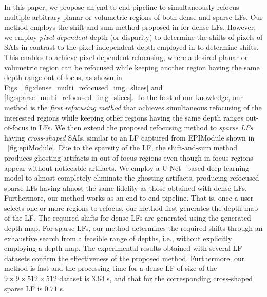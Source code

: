 In this paper, we propose an end-to-end pipeline to simultaneously refocus multiple arbitrary planar or volumetric regions of both dense and sparse LFs. Our method employs the shift-and-sum method proposed in \cite{ng2005light} for dense LFs. However, we employ \emph{pixel-dependent} depth (or disparity) to determine the shifts of pixels of SAIs in contrast to the pixel-independent depth employed in \cite{ng2005light} to determine shifts. This enables to achieve pixel-dependent refocusing, where a desired planar or volumetric region can be refocused while keeping another region having the same depth range out-of-focus, as shown in Figs.~\ref{fig:dense_multi_refocused_img_slices} and \ref{fig:sparse_multi_refocused_img_slices}. To the best of our knowledge, our method is the \emph{first refocusing method} that achieves simultaneous refocusing of the interested regions while keeping other regions having the same depth ranges out-of-focus in LFs. We then extend the proposed refocusing method to \emph{sparse LFs} having \emph{cross-shaped} SAIs, similar to an LF captured from EPIModule shown in \figurename~\ref{fig:epiModule}. Due to the sparsity of the LF, the shift-and-sum method produces ghosting artifacts in out-of-focus regions even though in-focus regions appear without noticeable artifacts. We employ a U-Net~\cite{unet} based deep learning model to almost completely eliminate the ghosting artifacts, producing refocused sparse LFs having almost the same fidelity as those obtained with dense LFs. Furthermore, our method works as an end-to-end pipeline. That is, once a user selects one or more regions to refocus, our method first generates the depth map of the LF. The required shifts for dense LFs are generated using the generated depth map. For sparse LFs, our method determines the required shifts through an exhaustive search from a feasible range of depths, i.e., without explicitly employing a depth map. The experimental results obtained with several LF datasets confirm the effectiveness of the proposed method. Furthermore, our method is fast and the processing time for a dense LF of size of the $9\times9\times512\times512$ dataset is $3.64$ s, and that for the corresponding cross-shaped sparse LF is $0.71$ s.

